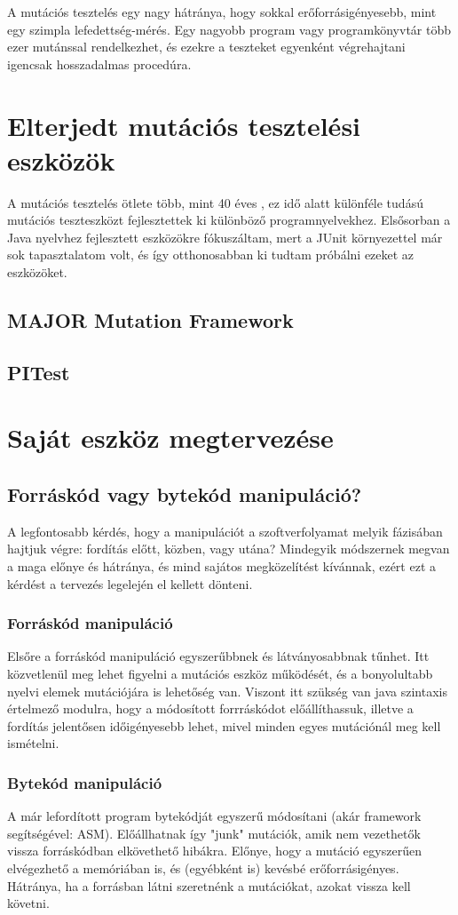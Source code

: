 A mutációs tesztelés egy nagy hátránya, hogy sokkal erőforrásigényesebb, mint egy szimpla lefedettség-mérés. Egy nagyobb program vagy programkönyvtár több ezer mutánssal rendelkezhet, és ezekre a teszteket egyenként végrehajtani igencsak hosszadalmas procedúra. 
\section{Elterjedt mutációs tesztelési eszközök}
A mutációs tesztelés ötlete több, mint 40 éves \cite{major_2011}, ez idő alatt különféle tudású mutációs teszteszközt fejlesztettek ki különböző programnyelvekhez. Elsősorban a Java nyelvhez fejlesztett eszközökre fókuszáltam, mert a JUnit környezettel már sok tapasztalatom volt, és így otthonosabban ki tudtam próbálni ezeket az eszközöket.
\subsection{MAJOR Mutation Framework}

\subsection{PITest}
\section{Saját eszköz megtervezése}
\subsection{Forráskód vagy bytekód manipuláció?}
A legfontosabb kérdés, hogy a manipulációt a szoftverfolyamat melyik fázisában hajtjuk végre: fordítás előtt, közben, vagy utána? Mindegyik módszernek megvan a maga előnye és hátránya, és mind sajátos megközelítést kívánnak, ezért ezt a kérdést a tervezés legelején el kellett dönteni.
\subsubsection{Forráskód manipuláció}
Elsőre a forráskód manipuláció egyszerűbbnek és látványosabbnak tűnhet. Itt közvetlenül meg lehet figyelni a mutációs eszköz működését, és a bonyolultabb nyelvi elemek mutációjára is lehetőség van. Viszont itt szükség van java szintaxis értelmező modulra, hogy a módosított forrráskódot előállíthassuk, illetve a fordítás jelentősen időigényesebb lehet, mivel minden egyes mutációnál meg kell ismételni.
\subsubsection{Bytekód manipuláció}
A már lefordított program bytekódját egyszerű módosítani (akár framework segítségével: ASM). Előállhatnak így "junk" mutációk, amik nem vezethetők vissza forráskódban elkövethető hibákra. Előnye, hogy a mutáció egyszerűen elvégezhető a memóriában is, és (egyébként is) kevésbé erőforrásigényes. Hátránya, ha a forrásban látni szeretnénk a mutációkat, azokat vissza kell követni.
